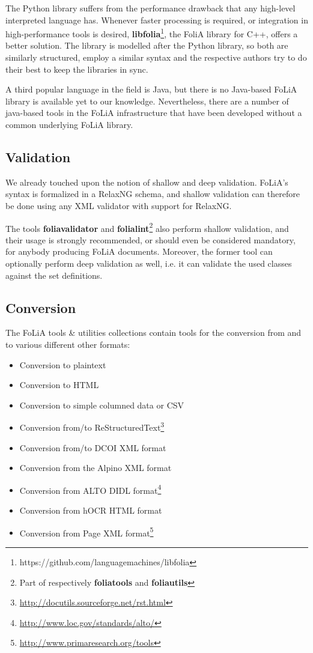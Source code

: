 \documentclass[a4paper,11pt]{article}
\begin{document}
The Python library suffers from the performance drawback that any high-level
interpreted language has. Whenever faster processing is required, or
integration in high-performance tools is desired,
\textbf{libfolia}\footnote{https://github.com/languagemachines/libfolia}, the
FoliA library for C++, offers a better solution. The library is modelled after
the Python library, so both are similarly structured, employ a similar syntax
and the respective authors try to do their best to keep the libraries in sync.

A third popular language in the field is Java, but there is no Java-based FoLiA
library is available yet to our knowledge. Nevertheless, there are a number of
java-based tools in the FoLiA infrastructure that have been developed
without a common underlying FoLiA library.

\subsection{Validation}

We already touched upon the notion of shallow and deep validation.
FoLiA's syntax is formalized in a RelaxNG schema, and shallow validation can
therefore be done using any XML validator with support for RelaxNG. 

The tools \textbf{foliavalidator} and \textbf{folialint}\footnote{Part of
respectively \textbf{foliatools} and \textbf{foliautils}} also perform shallow validation, and
their usage is strongly recommended, or should even be considered mandatory,
for anybody producing FoLiA documents. Moreover, the former tool can optionally perform
deep validation as well, i.e. it can validate the used classes against the set
definitions.

\subsection{Conversion}

The FoLiA tools \& utilities collections contain tools for the conversion from and to
various different other formats:

\begin{itemize}
    \item Conversion to plaintext
    \item Conversion to HTML
    \item Conversion to simple columned data or CSV
    \item Conversion from/to ReStructuredText\footnote{\url{http://docutils.sourceforge.net/rst.html}}
    \item Conversion from/to DCOI XML format \cite{DCOI}
    \item Conversion from the Alpino XML format \cite{ALPINO}
    \item Conversion from ALTO DIDL format\footnote{\url{http://www.loc.gov/standards/alto/}}
    \item Conversion from hOCR HTML format  \cite{Breuel2007}
    \item Conversion from Page XML format\footnote{\url{http://www.primaresearch.org/tools}}
\end{itemize}
\end{document}

